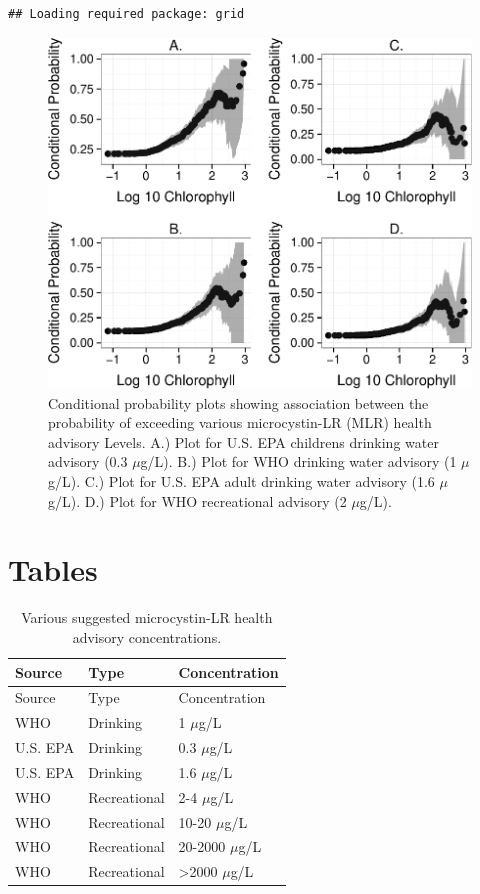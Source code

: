 \documentclass[11pt,]{article}
\begin{document}
\newpage

\begin{verbatim}
## Loading required package: grid
\end{verbatim}

\begin{figure}[htbp]
\centering
\includegraphics{manuscript_files/figure-latex/epa_child_cp_plot-1.pdf}
\caption{Conditional probability plots showing association between the
probability of exceeding various microcystin-LR (MLR) health advisory
Levels. A.) Plot for U.S. EPA childrens drinking water advisory (0.3
\(\mu\)g/L). B.) Plot for WHO drinking water advisory (1 \(\mu\)g/L).
C.) Plot for U.S. EPA adult drinking water advisory (1.6 \(\mu\)g/L).
D.) Plot for WHO recreational advisory (2 \(\mu\)g/L).
\label{fig:multi_cp_plot}}
\end{figure}

\newpage

\section{Tables}\label{tables}

\begin{longtable}[c]{@{}lll@{}}
\caption{Various suggested microcystin-LR health advisory
concentrations. \label{tab:microcystin_levels}}\tabularnewline
\toprule
Source & Type & Concentration\tabularnewline
\midrule
\endfirsthead
\toprule
Source & Type & Concentration\tabularnewline
\midrule
\endhead
WHO & Drinking & 1 \(\mu\)g/L\tabularnewline
U.S. EPA & Drinking & 0.3 \(\mu\)g/L\tabularnewline
U.S. EPA & Drinking & 1.6 \(\mu\)g/L\tabularnewline
WHO & Recreational & 2-4 \(\mu\)g/L\tabularnewline
WHO & Recreational & 10-20 \(\mu\)g/L\tabularnewline
WHO & Recreational & 20-2000 \(\mu\)g/L\tabularnewline
WHO & Recreational & \textgreater{}2000 \(\mu\)g/L\tabularnewline
\bottomrule
\end{longtable}
\end{document}
